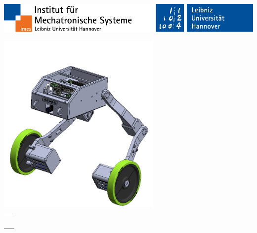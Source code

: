 %
\begin{titlepage}
	\begin{spacing}{2}
			
			\begin{flushright} %
					\vspace*{-20mm}
					\includegraphics[width=\textwidth]{Figures/title/CoverLogos.pdf}
				\end{flushright} %
			
			\vspace{38mm} {\centering {{\LARGE{\Titel}}} %
					
					\vfill
					\includegraphics[width = 80mm]{Figures/title/Robot_Assembly_3}
					
					
					\vfill }
		\end{spacing}
	\begin{spacing}{1}
			\begin{tabular}{l}
					\Large{\ArtDerArbeit~\Kennnummer}
				\end{tabular}
			
			\vspace{5mm}
			

\end{spacing}
\end{titlepage}

